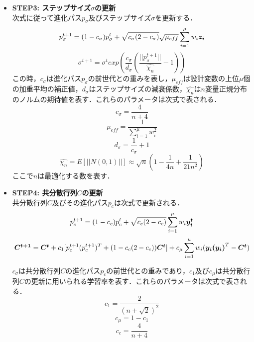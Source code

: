 \documentclass[a4j,11pt]{jarticle}
\begin{document}
\begin{itemize}
\item {\bf STEP3: ステップサイズ$\sigma$の更新} \\
次式に従って進化パス$p_{\sigma}$及びステップサイズ$\sigma$を更新する．
\begin{equation}
\label{eq:cmaes-ps}
p_{\sigma}^{t+1}=(1-c_{\sigma})p_{\sigma}^t+\sqrt{c_{\sigma}(2-c_{\sigma})}\sqrt{\mu_{eff}}\sum_{i=1}^{\mu}w_i \mbox{\boldmath $z_i$}
\end{equation}
\begin{equation}
\label{eq:cmaes-s}
\sigma^{t+1}=\sigma^t exp(\frac{c_{\sigma}}{d_{\sigma}}(\frac{||p_{\sigma}^{t+1}||}{\hat{\chi_n}}-1))
\end{equation}
この時，$c_{\sigma}$は進化パス$p_{\sigma}$の前世代との重みを表し，$\mu_{eff}$は設計変数の上位$\mu$個の加重平均の補正値，$d_{\sigma}$はステップサイズの減衰係数，$\hat{\chi_n}$は$n$変量正規分布のノルムの期待値を表す．これらのパラメータは次式で表される．
\begin{equation}
\label{eq:cmaes-csig}
c_{\sigma}=\frac{4}{n+4}
\end{equation}
\begin{equation}
\label{eq:cmaes-mu-eff}
\mu_{eff}=\frac{1}{\sum_{i=1}^{\mu}w_i^2}
\end{equation}
\begin{equation}
\label{eq:cmaes-d}
d_{\sigma}=\frac{1}{c_{\sigma}}+1
\end{equation}
\begin{equation}
\label{eq:cmaes-chi}
\hat{\chi_n}=E[||N(0,1)||] \approx \sqrt{n}(1-\frac{1}{4n}+\frac{1}{21n^2})
\end{equation}
ここで$n$は最適化する数を表す．

\item {\bf STEP4: 共分散行列$C$の更新} \\
共分散行列$C$及びその進化パス$p_c$は次式で更新される．
\begin{equation}
\label{eq:cmaes-pc}
p_c^{t+1}=(1-c_c)p_c^t+\sqrt{c_c(2-c_c)} \sum_{i=1}^{\mu}w_i \mbox{\boldmath $y_i^t$}
\end{equation}
\begin{equation}
\label{eq:cmaes-c}
\mbox{\boldmath $C^{t+1}$}=\mbox{\boldmath $C^t$}+c_1[p_c^{t+1}(p_c^{t+1})^T+(1-c_c(2-c_c))\mbox{\boldmath $C^t$}]+c_{\mu}\sum_{i=1}^{\mu}w_i(\mbox{\boldmath $y_i(y_i)$}^T-\mbox{\boldmath $C^t$})
\end{equation}


$c_{\sigma}$は共分散行列$C$の進化パス$p_c$の前世代との重みであり，$c_1$及び$c_{\mu}$は共分散行列$C$の更新に用いられる学習率を表す．これらのパラメータは次式で表される．
\begin{equation}
\label{eq:cmaes-c1}
c_{1}=\frac{2}{(n+\sqrt{2})^2}
\end{equation}
\begin{equation}
\label{eq:cmaes-cmu}
c_{\mu}=1-c_1
\end{equation}
\begin{equation}
\label{eq:cmaes-cc}
c_c=\frac{4}{n+4}
\end{equation}

\end{itemize}
\end{document}

